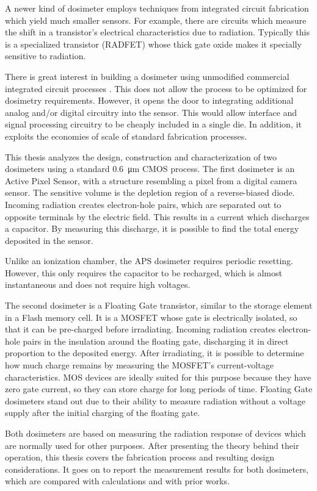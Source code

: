 A newer kind of dosimeter employs techniques from integrated circuit fabrication
which yield much smaller sensors\cite{holmes-siedle_radfet:_1986}.
For example, there are circuits which measure 
the shift in a transistor's electrical characteristics
due to radiation.
Typically this is a specialized transistor (RADFET)
whose thick gate oxide makes it specially sensitive to radiation.

There is great interest in building a dosimeter using 
unmodified commercial integrated circuit processes\cite{lipovetzky_field_2013}
\cite{wang_temperature_2005}
\cite{garcia-moreno_floating_2012}
\cite{dulinski_cmos_2004}.
This does not allow the process to be optimized for dosimetry requirements.
However, it opens the door to integrating additional analog and/or digital
circuitry into the sensor.
This would allow interface and signal processing circuitry to be cheaply included in a single die.
In addition, it exploits the economies of scale of standard fabrication processes.

This thesis analyzes the design, construction and characterization
of two dosimeters using a standard \SI{0.6}{\micro\meter} CMOS process.
The first dosimeter is an Active Pixel Sensor,
with a structure resembling a pixel from a digital camera sensor.
The sensitive volume is the depletion region of a reverse-biased diode.
Incoming radiation creates electron-hole pairs,
which are separated out to opposite terminals by the electric field.
This results in a current which discharges a capacitor.
By measuring this discharge, it is possible to find the total energy deposited in the sensor.

Unlike an ionization chamber,
the APS dosimeter requires periodic resetting.
However, this only requires the capacitor to be recharged,
which is almost instantaneous and does not require high voltages.

The second dosimeter is a Floating Gate transistor,
similar to the storage element in a Flash memory cell.
It is a MOSFET whose gate is electrically isolated,
so that it can be pre-charged before irradiating.
Incoming radiation creates electron-hole pairs in the insulation around the floating gate,
discharging it in direct proportion to the deposited energy.
After irradiating, it is possible to determine how much charge remains
by measuring the MOSFET's current-voltage characteristics.
MOS devices are ideally suited for this purpose because they have zero gate current,
so they can store charge for long periods of time.
Floating Gate dosimeters stand out due to their ability to measure radiation without
a voltage supply after the initial charging of the floating gate.

Both dosimeters are based on measuring the radiation response of devices which are normally used for other purposes.
After presenting the theory behind their operation,
this thesis covers the fabrication process and resulting design considerations.
It goes on to report the measurement results for both dosimeters,
which are compared with calculations and with prior works.
